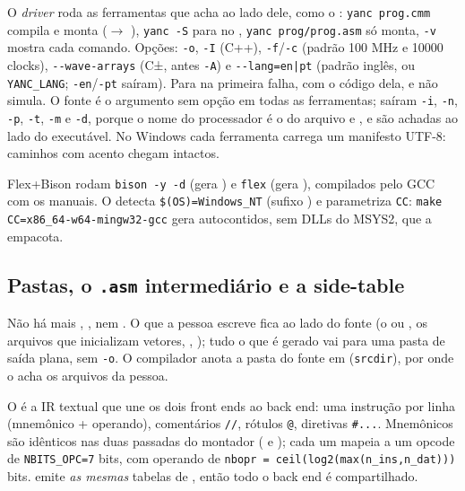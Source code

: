 O \emph{driver} roda as ferramentas que acha ao lado dele, como o :
\lstinline|yanc prog.cmm| compila e monta ($\to$ ),
\lstinline|yanc -S| para no , \lstinline|yanc prog/prog.asm| só monta,
\lstinline|-v| mostra cada comando. Opções: \lstinline|-o|, \lstinline|-I| (C++),
\lstinline|-f|/\lstinline|-c| (padrão 100 MHz e 10000 clocks),
\lstinline|--wave-arrays| (C±, antes \lstinline|-A|) e \lstinline!--lang=en|pt!
(padrão inglês, ou \lstinline|YANC_LANG|; \lstinline|-en|/\lstinline|-pt| saíram).
Para na primeira falha, com o código dela, e não simula. O fonte é o argumento sem
opção em todas as ferramentas; saíram \lstinline|-i|, \lstinline|-n|,
\lstinline|-p|, \lstinline|-t|, \lstinline|-m| e \lstinline|-d|, porque o nome do
processador é o do arquivo e ,  e  são
achadas ao lado do executável. No Windows cada ferramenta carrega um manifesto
UTF-8: caminhos com acento chegam intactos.

Flex+Bison rodam \lstinline|bison -y -d| (gera ) e
\lstinline|flex| (gera ), compilados pelo GCC com os 
manuais. O  detecta \lstinline|$(OS)=Windows_NT| (sufixo
) e parametriza \lstinline|CC|: \lstinline|make CC=x86_64-w64-mingw32-gcc|
gera  autocontidos, sem DLLs do MSYS2, que a  empacota.

\subsection{Pastas, o \texttt{.asm} intermediário e a side-table}
\label{sec:S04-asm}

Não há mais , ,  nem
. O que a pessoa escreve fica ao lado do fonte (o  ou
, os arquivos que inicializam vetores, ,
); tudo o que é gerado vai para uma pasta de saída plana,
 sem \lstinline|-o|. O compilador anota a pasta do fonte em
 (\lstinline|srcdir|), por onde o  acha os
arquivos da pessoa.

O  é a IR textual que une os dois front ends ao back end: uma
instrução por linha (mnemônico + operando), comentários \lstinline|//|, rótulos
\lstinline|@|, diretivas \lstinline|#...|. Mnemônicos são idênticos nas duas
passadas do montador ( e ); cada um mapeia a um
opcode de \lstinline|NBITS_OPC=7| bits, com operando de
\lstinline|nbopr = ceil(log2(max(n_ins,n_dat)))| bits.  emite
\emph{as mesmas} tabelas de , então todo o back end é compartilhado.

